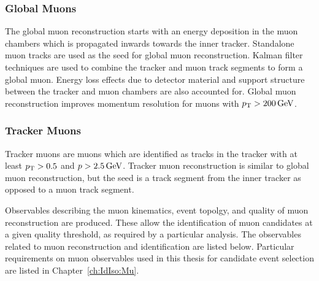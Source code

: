\subsubsection{Global Muons}
The global muon reconstruction starts with an energy deposition in the muon chambers which is propagated inwards towards the inner tracker. Standalone muon tracks are used as the seed for global muon reconstruction. Kalman filter techniques are used to combine the tracker and muon track segments to form a global muon. Energy loss effects due to detector material and support structure between the tracker and muon chambers are also accounted for. Global muon reconstruction improves momentum resolution for muons with $p_{\mathrm{T}} > 200 \,\text{Ge\hspace{-.08em}V}$.

\subsubsection{Tracker Muons}
Tracker muons are muons which are identified as tracks in the tracker with at least $p_{\mathrm{T}} > 0.5$ and $p > 2.5\,\text{Ge\hspace{-.08em}V}$. Tracker muon reconstruction is similar to global muon reconstruction, but the seed is a track segment from the inner tracker as opposed to a muon track segment.

Observables describing the muon kinematics, event topolgy, and quality of muon reconstruction are produced. These allow the identification of muon candidates at a given quality threshold, as required by a particular analysis. The observables related to muon reconstruction and identification are listed below. Particular requirements on muon observables used in this thesis for candidate event selection are listed in Chapter~\ref{ch:IdIso:Mu}.  





